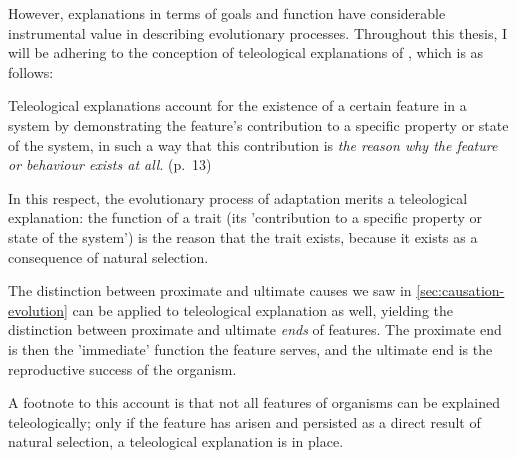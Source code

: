 However, explanations in terms of goals and function have considerable instrumental value in describing evolutionary processes. Throughout this thesis, I will be adhering to the conception of teleological explanations of \citet{Ayala99}, which is as follows:
\begin{quoting}
    Teleological explanations account for the existence of a certain feature in a system by demonstrating the feature’s contribution to a specific property or state of the system, in such a way that this contribution is \emph{the reason why the feature or behaviour exists at all}.
    \hfill (p.~13)
\end{quoting}
In this respect, the evolutionary process of adaptation merits a teleological explanation: the function of a trait (its 'contribution to a specific property or state of the system') is the reason that the trait exists, because it exists as a consequence of natural selection.

The distinction between proximate and ultimate causes we saw in \cref{sec:causation-evolution} can be applied to teleological explanation as well, yielding the distinction between proximate and ultimate \emph{ends} of features. The proximate end is then the 'immediate' function the feature serves, and the ultimate end is the reproductive success of the organism.

A footnote to this account is that not all features of organisms can be explained teleologically; only if the feature has arisen and persisted as a direct result of natural selection, a teleological explanation is in place.

